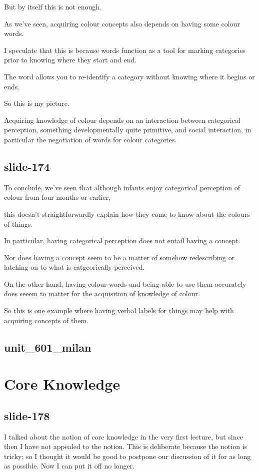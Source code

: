 \documentclass[12pt,\papersize]{extarticle}
\begin{document}
But by itself this is not enough.
 
As we've seen, acquiring colour concepts also depends on having some colour words.
 
I speculate that this is because words function as a tool for marking categories prior to knowing where they start and end.
 
The word allows you to re-identify a category without knowing where it begins or ends.
 
So this is my picture.
 
Acquiring knowledge of colour depends on an interaction between categorical perception, something developmentally quite primitive, and social interaction, in particular the negotiation of words for colour categories.
 
\subsection{slide-174}
To conclude, we've seen that although infants enjoy categorical perception of colour from four months or earlier,
 
this doesn't straightforwardly explain how they come to know about the colours of things.
 
In particular, having categorical perception does not entail having a concept.
 
Nor does having a concept seem to be a matter of somehow redescribing or latching on to what is catgeorically perceived.
 
On the other hand, having colour words and being able to use them accurately does seeem to matter for the acquisition of knowledge of colour.
 
So this is one example where having verbal labels for things may help with acquiring concepts of them.
 
\subsection{unit\_601\_milan}
 
 
\section{Core Knowledge}
 
\subsection{slide-178}
I talked about the notion of core knowledge in the very first lecture, but since then I 
have not appealed to the notion.
This is deliberate because the notion is tricky; so I thought it would be good to postpone
our discussion of it for as long as possible.
Now I can put it off no longer.
 
\end{document}
